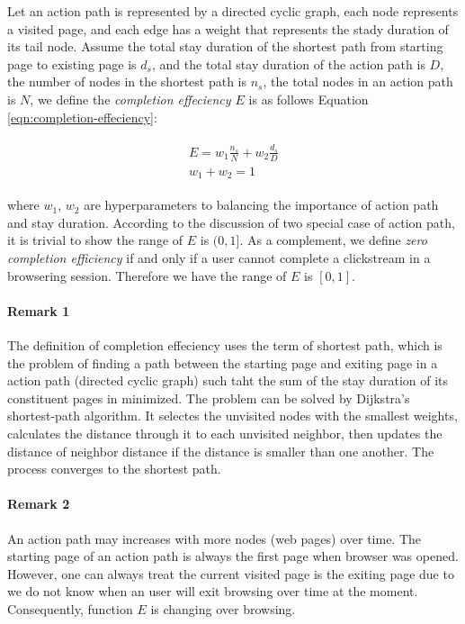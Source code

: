 Let an action path is represented by a directed cyclic graph, each node represents a visited page,
and each edge has a weight that represents the stady duration of its tail node.
Assume the total stay duration of the shortest path from starting page to existing page
is $d_s$, and the total stay duration of the action path is $D$, 
the number of nodes in the shortest path is $n_s$, the total nodes 
in an action path is $N$, we define the \emph{completion effeciency $E$} is 
as follows Equation \ref{eqn:completion-effeciency}:

\begin{align}
\label{eqn:completion-effeciency}
\begin{split}
    E = w_1 \frac{n_s}{N} + w_2 \frac{d_s}{D}\\
    w_1 + w_2 = 1
\end{split}
\end{align}

where $w_1$, $w_2$ are hyperparameters to balancing the importance of action path 
and stay duration. According to the discussion of two special case of action path,
it is trivial to show the range of $E$ is $(0, 1]$. As a complement, we define \emph{zero
completion efficiency} if and only if a user cannot complete a clickstream 
in a browsering session. Therefore we have the range of $E$ is $[0, 1]$.

\paragraph{Remark 1} The definition of completion effeciency uses the term of shortest path,
which is the problem of finding a path between the starting page and exiting page
 in a action path (directed cyclic graph) such taht the sum of
the stay duration of its constituent pages in minimized.
The problem can be solved by Dijkstra's \cite{dijkstra1959note} shortest-path algorithm. It 
selectes the unvisited nodes with the smallest weights, calculates the distance 
through it to each unvisited neighbor, then updates the distance of neighbor distance 
if the distance is smaller than one another. The process converges to the shortest path.

\paragraph{Remark 2} An action path may increases with more nodes (web pages) over time.
The starting page of an action path is always the first page when browser was opened.
However, one can always treat the current visited page is the exiting page due to we
do not know when an user will exit browsing over time at the moment. 
Consequently, function $E$ is changing over browsing.

